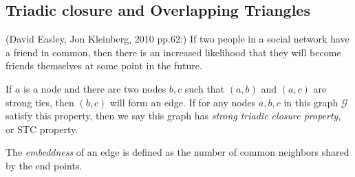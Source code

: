 \subsection{Triadic closure and Overlapping Triangles}
\begin{intuition}
	(David Easley, Jon Kleinberg, 2010 pp.62:) If two people in a social network have a friend in common, then there is an increased likelihood
	that they will become friends themselves at some point in the future.
\end{intuition}

\begin{definition}
	If \(a\) is a node and there are two nodes \(b, c\) such that \((a, b)\) and \((a, c)\) are strong ties, then \((b, c)\) will form an edge.
	If for any nodes \(a, b, c\) in this graph \(\mathcal{G}\) satisfy this property, then we say this graph has \emph{strong triadic closure property}, or STC property.
\end{definition}

\begin{definition}
	The \emph{embeddness} of an edge is defined as the number of common neighbors shared by the end points.
\end{definition}


